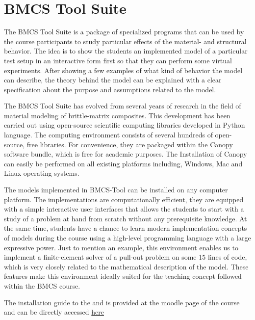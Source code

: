 \documentclass[main.tex]{subfiles}
\begin{document}
\section{BMCS Tool Suite}

The BMCS Tool Suite is a package of specialized programs that can be used by the course participants to study particular effects of the material- and structural behavior. The idea is to show the students an implemented model of a particular test setup in an interactive form first so that they can perform some virtual experiments. After showing a few examples of what kind of behavior the model can describe, the theory behind the model can be explained with a clear specification about the purpose and assumptions related to the model. 

The BMCS Tool Suite has evolved from several years of research in the field of material modeling of brittle-matrix composites. This development has been carried out using open-source scientific computing libraries developed in Python language. The computing environment consists of several hundreds of open-source, free libraries. For convenience, they are packaged within the Canopy software bundle, which is free for academic purposes. The Installation of Canopy can easily be performed on all existing platforms including, Windows, Mac and Linux operating systems. 

The models implemented in BMCS-Tool can be installed on any computer platform. The implementations are computationally efficient, they are equipped with a simple interactive user interfaces that allows the students to start with a study of a problem at hand from scratch without any prerequisite knowledge. At the same time, students have a chance to learn modern implementation concepts of models during the course using a high-level programming language with a large expressive power. Just to mention an example, this environment enables us to implement a finite-element solver of a pull-out problem on some 15 lines of code, which is very closely related to the mathematical description of the model. These features make this environment ideally suited for the teaching concept followed within the BMCS course. 

The installation guide to the  and  is provided at the moodle page of the course 
and can be directly accessed
\href{https://store.enthought.com/downloads}
{here} 
\end{document}
